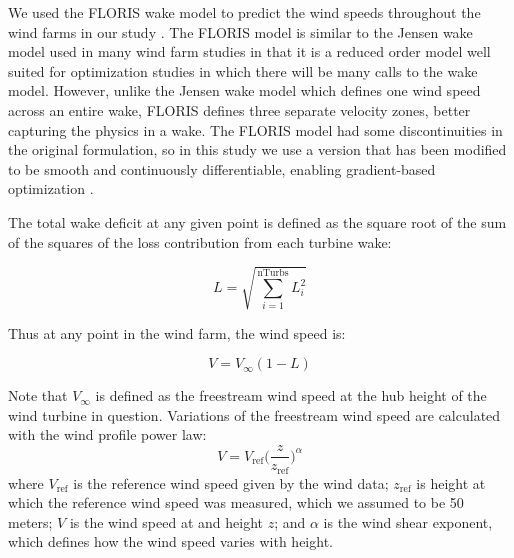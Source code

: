 We used the FLORIS wake model to predict the wind speeds throughout the wind farms in our study \citep{gebraad2016wind}. The FLORIS model is similar to the Jensen wake model used in many wind farm studies \citep{jensen1983note} in that it is a reduced order model well suited for optimization studies in which there will be many calls to the wake model. However, unlike the Jensen wake model which defines one wind speed across an entire wake, FLORIS defines three separate velocity zones, better capturing the physics in a wake. 
The FLORIS model had some discontinuities in the original formulation, so in this study we use a version that has been modified to be smooth and continuously differentiable, enabling gradient-based optimization \citep{thomas2017improving}.


The total wake deficit at any given point is defined as the square root of the sum of the squares of the loss contribution from each turbine wake:

\begin{equation}
L = \sqrt{\sum_{i=1}^\text{nTurbs}L_i^2}
\end{equation}

\noindent Thus at any point in the wind farm, the wind speed is:

\begin{equation}
V = V_\infty(1-L)
\end{equation}

\noindent Note that $V_\infty$ is defined as the freestream wind speed at the hub height of the wind turbine in question. Variations of the freestream wind speed are calculated with the wind profile power law: 
\begin{equation}
V = V_{\text{ref}}\Big(\frac{z}{z_{\text{ref}}}\Big)^\alpha
\label{Eq:shear}
\end{equation}
where $V_{\text{ref}}$ is the reference wind speed given by the wind data; $z_{\text{ref}}$ is height at which the reference wind speed was measured, which we assumed to be 50 meters; $V$ is the wind speed at and height $z$; and $\alpha$ is the wind shear exponent, which defines how the wind speed varies with height.